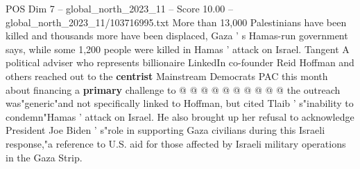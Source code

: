 \begin{textsample}{POS Dim 7 – global\_north\_2023\_11 – Score 10.00 – global\_north\_2023\_11/103716995.txt}
More than 13,000 Palestinians have been killed and thousands more have been displaced, Gaza ' s Hamas-run government says, while some 1,200 people were killed in Hamas ' attack on Israel.
Tangent A political adviser who represents billionaire LinkedIn co-founder Reid Hoffman and others reached out to the \textbf{centrist} Mainstream Democrats PAC this month about financing a \textbf{primary} challenge to @ @ @ @ @ @ @ @ @ @ the outreach was"generic"and not specifically linked to Hoffman, but cited Tlaib ' s"inability to condemn"Hamas ' attack on Israel.
He also brought up her refusal to acknowledge President Joe Biden ' s"role in supporting Gaza civilians during this Israeli response,"a reference to U.S. aid for those affected by Israeli military operations in the Gaza Strip.

\end{textsample}
